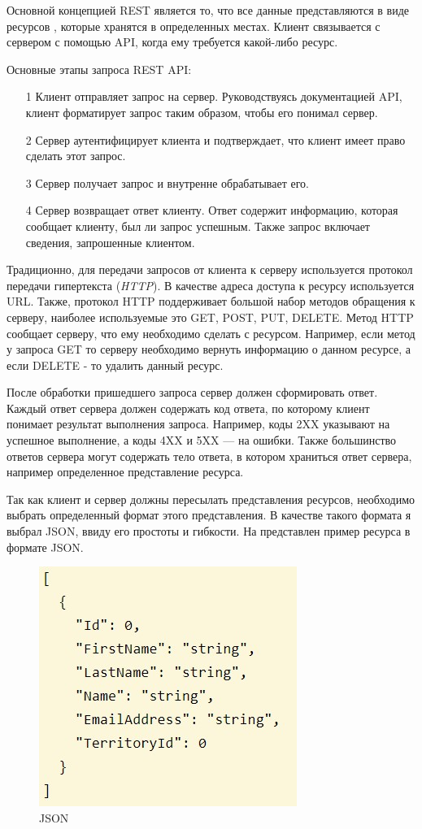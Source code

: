 Основной концепцией REST является то, что все данные представляются в виде ресурсов , которые хранятся в определенных местах. Клиент связывается с сервером с помощью API, когда ему требуется какой-либо ресурс. 

Основные этапы запроса REST API:
\begin{enumerate}
	\item[1] Клиент отправляет запрос на сервер. Руководствуясь документацией API, клиент форматирует запрос таким образом, чтобы его понимал сервер.
	\item[2] Сервер аутентифицирует клиента и подтверждает, что клиент имеет право сделать этот запрос.
	\item[3] Сервер получает запрос и внутренне обрабатывает его.
	\item[4] Сервер возвращает ответ клиенту. Ответ содержит информацию, которая сообщает клиенту, был ли запрос успешным. Также запрос включает сведения, запрошенные клиентом.
\end{enumerate}

Традиционно, для передачи запросов от клиента к серверу используется протокол передачи гипертекста (\textit{HTTP}). В качестве адреса доступа к ресурсу используется URL. Также, протокол HTTP поддерживает большой набор методов обращения к серверу, наиболее используемые это GET, POST, PUT, DELETE. Метод HTTP сообщает серверу, что ему необходимо сделать с ресурсом. Например, если метод у запроса GET то серверу необходимо вернуть информацию о данном ресурсе, а если DELETE - то удалить данный ресурс. 

После обработки пришедшего запроса сервер должен сформировать ответ. Каждый ответ сервера должен содержать код ответа, по которому клиент понимает результат выполнения запроса. Например, коды 2XX указывают на успешное выполнение, а коды 4XX и 5XX — на ошибки. Также большинство ответов сервера могут содержать тело ответа, в котором храниться ответ сервера, например определенное представление ресурса. 

Так как клиент и сервер должны пересылать представления ресурсов, необходимо выбрать определенный формат этого представления. В качестве такого формата  я выбрал JSON, ввиду его простоты и гибкости. На  представлен пример ресурса в формате JSON. 

\begin{figure}[ht!] 
	\center
	\includegraphics [scale=0.6] {my_folder/images//json}
	\caption{JSON} 
	\label{fig:json}  
\end{figure}

